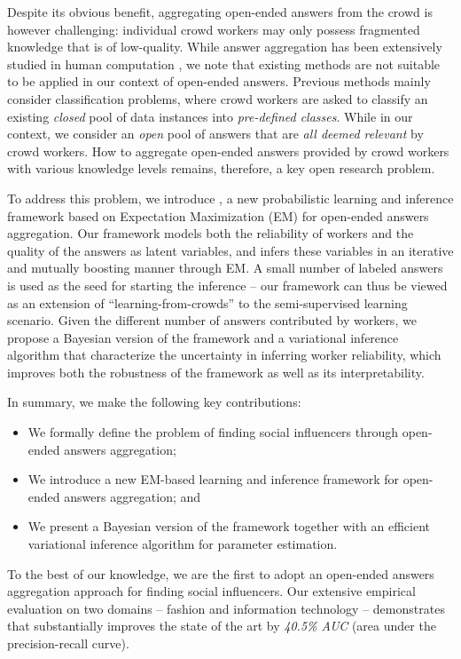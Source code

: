 Despite its obvious benefit, aggregating open-ended answers from the crowd is however challenging: individual crowd workers may only possess fragmented knowledge that is of low-quality. While answer aggregation has been extensively studied in human computation \cite{dawid1979maximum,whitehill2009whose,ZhengLLSC17}, we note that existing methods are not suitable to be applied in our context of open-ended answers. Previous methods mainly consider classification problems, where crowd workers are asked to classify an existing \emph{closed} pool of data instances into \emph{pre-defined classes}. While in our context, we consider an \emph{open} pool of answers that are \emph{all deemed relevant} by crowd workers. How to aggregate open-ended answers provided by crowd workers with various knowledge levels remains, therefore, a key open research problem.

To address this problem, we introduce \sys, a new probabilistic learning and inference framework based on Expectation Maximization (EM) for open-ended answers aggregation. Our framework models both the reliability of workers and the quality of the answers as latent variables, and infers these variables in an iterative and mutually boosting manner through EM. A small number of labeled answers is used as the seed for starting the inference -- our framework can thus be viewed as an extension of ``learning-from-crowds''  \cite{raykar2010learning,tian2012learning,yang2018leveraging} to the semi-supervised learning scenario. Given the different number of answers contributed by workers, we propose a Bayesian version of the framework and a variational inference algorithm that characterize the uncertainty in inferring worker reliability, which improves both the robustness of the framework as well as its interpretability. 

In summary, we make the following key contributions:
\begin{itemize}
\item We formally define the problem of finding social influencers through open-ended answers aggregation;
\item We introduce a new EM-based learning and inference framework for open-ended answers aggregation; and
\item We present a Bayesian version of the framework together with an efficient variational inference algorithm for parameter estimation. 
\end{itemize}

To the best of our knowledge, we are the first to adopt an open-ended answers aggregation approach for finding social influencers. Our extensive empirical evaluation on two domains -- fashion and information technology -- demonstrates that \sys substantially improves the state of the art by \emph{40.5\% AUC} (area under the precision-recall curve).

